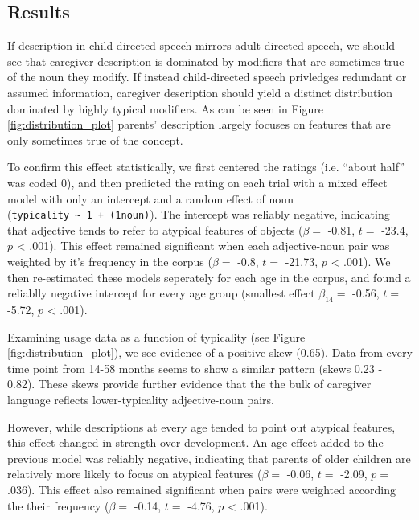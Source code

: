 \documentclass[10pt, letterpaper]{article}
\begin{document}
\hypertarget{results}{%
\subsection{Results}\label{results}}

If description in child-directed speech mirrors adult-directed speech,
we should see that caregiver description is dominated by modifiers that
are sometimes true of the noun they modify. If instead child-directed
speech privledges redundant or assumed information, caregiver
description should yield a distinct distribution dominated by highly
typical modifiers. As can be seen in Figure \ref{fig:distribution_plot}
parents' description largely focuses on features that are only sometimes
true of the concept.

To confirm this effect statistically, we first centered the ratings
(i.e. ``about half'' was coded 0), and then predicted the rating on each
trial with a mixed effect model with only an intercept and a random
effect of noun
(\texttt{typicality\ \textasciitilde{}\ 1\ +\ (1\textbar{}noun)}). The
intercept was reliably negative, indicating that adjective tends to
refer to atypical features of objects (\(\beta =\) -0.81, \(t =\) -23.4,
\(p\) \textless{} .001). This effect remained significant when each
adjective-noun pair was weighted by it's frequency in the corpus
(\(\beta =\) -0.8, \(t =\) -21.73, \(p\) \textless{} .001). We then
re-estimated these models seperately for each age in the corpus, and
found a reliablly negative intercept for every age group (smallest
effect \(\beta_{14} =\) -0.56, \(t =\) -5.72, \(p\) \textless{} .001).

Examining usage data as a function of typicality (see Figure
\ref{fig:distribution_plot}), we see evidence of a positive skew (0.65).
Data from every time point from 14-58 months seems to show a similar
pattern (skews 0.23 - 0.82). These skews provide further evidence that
the the bulk of caregiver language reflects lower-typicality
adjective-noun pairs.

However, while descriptions at every age tended to point out atypical
features, this effect changed in strength over development. An age
effect added to the previous model was reliably negative, indicating
that parents of older children are relatively more likely to focus on
atypical features (\(\beta =\) -0.06, \(t =\) -2.09, \(p =\) .036). This
effect also remained significant when pairs were weighted according the
their frequency (\(\beta =\) -0.14, \(t =\) -4.76, \(p\) \textless{}
.001).
\end{document}
